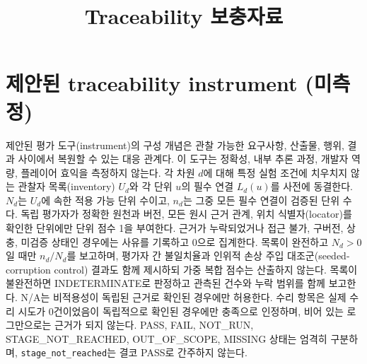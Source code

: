 \documentclass[journal]{IEEEtran}
\title{Traceability 보충자료}
\author{}
\begin{document}
\maketitle

\setcounter{table}{13}

\section{제안된 traceability instrument (미측정)}
{\raggedright
제안된 평가 도구(instrument)의 구성 개념은 관찰 가능한 요구사항, 산출물, 행위, 결과 사이에서 복원할 수 있는 대응 관계다. 이 도구는 정확성, 내부 추론 과정, 개발자 역량, 플레이어 효익을 측정하지 않는다. 각 차원 $d$에 대해 특정 실험 조건에 치우치지 않는 관찰자 목록(inventory) $U_d$와 각 단위 $u$의 필수 연결 $L_d(u)$를 사전에 동결한다. $N_d$는 $U_d$에 속한 적용 가능 단위 수이고, $n_d$는 그중 모든 필수 연결이 검증된 단위 수다. 독립 평가자가 정확한 원천과 버전, 모든 원시 근거 관계, 위치 식별자(locator)를 확인한 단위에만 단위 점수 1을 부여한다. 근거가 누락되었거나 접근 불가, 구버전, 상충, 미검증 상태인 경우에는 사유를 기록하고 0으로 집계한다. 목록이 완전하고 $N_d>0$일 때만 $n_d/N_d$를 보고하며, 평가자 간 불일치율과 인위적 손상 주입 대조군(seeded-corruption control) 결과도 함께 제시하되 가중 복합 점수는 산출하지 않는다. 목록이 불완전하면 INDETERMINATE로 판정하고 관측된 건수와 누락 범위를 함께 보고한다. N/A는 비적용성이 독립된 근거로 확인된 경우에만 허용한다. 수리 항목은 실제 수리 시도가 0건이었음이 독립적으로 확인된 경우에만 충족으로 인정하며, 비어 있는 로그만으로는 근거가 되지 않는다. PASS, FAIL, NOT\_RUN, STAGE\_NOT\_REACHED, OUT\_OF\_SCOPE, MISSING 상태는 엄격히 구분하며, \texttt{stage\_not\_reached}는 결코 PASS로 간주하지 않는다.
\par}
\end{document}
